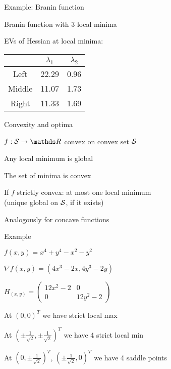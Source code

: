\documentclass[11pt,compress,t,notes=noshow, xcolor=table]{beamer}
\begin{document}

\begin{framei}{Example: Branin function}
\item Branin function with 3 local minima   
\item EVs of Hessian at local minima:
\begin{center}
\begin{tabular}{c|c|c}
        & $\lambda_1$ & $\lambda_2$ \\ \hline\hline
Left    & 22.29       & 0.96        \\ \hline
Middle  & 11.07       & 1.73        \\ \hline
Right   & 11.33       & 1.69        \\
\end{tabular}
\end{center}
\end{framei}

\begin{framei}{Convexity and optima}
\item $f: \S \to \R$ convex on convex set $\S$
\item Any local minimum is global
\item The set of minima is convex
\item If $f$ strictly convex: at most one local minimum\\
(unique global on $\S$, if it exists)
\item Analogously for concave functions
\end{framei}
  
\begin{framei}{Example}
\item $f(x,y) = x^4 + y^4 - x^2 - y^2$
\item $\nabla f(x,y) = (4x^3 - 2x, 4y^3 - 2y)$
\item $H_(x,y) = 
\begin{pmatrix}
12x^2 - 2 &  0          \\ 
0         & 12y^2 - 2
\end{pmatrix}$ 
\item At $(0,0)^T$ we have strict local max
\item At $(\pm \frac1{\sqrt{2}}, \pm \frac1{\sqrt{2}})^T$ we have 4 strict local min
\item At $(0, \pm \frac1{\sqrt{2}})^T$, $(\pm \frac1{\sqrt{2}}, 0)^T$ we have 4 saddle points
\end{framei}


\endlecture
\end{document}
